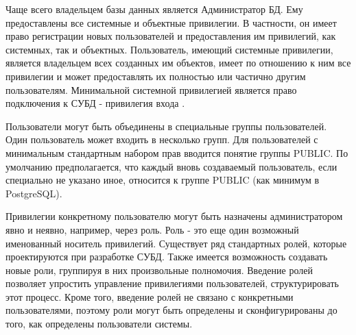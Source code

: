 Чаще всего владельцем базы данных является Администратор БД. Ему предоставлены все системные и объектные
привилегии. В частности, он имеет право регистрации новых пользователей и предоставления им привилегий, как
системных, так и объектных. Пользователь, имеющий системные привилегии, является владельцем всех созданных им
объектов, имеет по отношению к ним все привилегии и может предоставлять их полностью или частично другим
пользователям. Минимальной системной привилегией является право подключения к СУБД - привилегия входа
\autocite{Skakun}.

Пользователи могут быть объединены в специальные группы пользователей. Один пользователь может входить в
несколько групп. Для пользователей с минимальным стандартным набором прав вводится понятие группы PUBLIC.
По умолчанию предполагается, что каждый вновь создаваемый пользователь, если специально не указано иное,
относится к группе PUBLIC (как минимум в PostgreSQL).

Привилегии конкретному пользователю могут быть назначены администратором явно и неявно, например, через роль.
Роль - это еще один возможный именованный носитель привилегий. Существует ряд стандартных ролей, которые
проектируются при разработке СУБД. Также имеется возможность создавать новые роли, группируя в них произвольные
полномочия. Введение ролей позволяет упростить управление привилегиями пользователей, структурировать этот
процесс. Кроме того, введение ролей не связано с конкретными пользователями, поэтому роли могут быть определены
и сконфигурированы до того, как определены пользователи системы.

